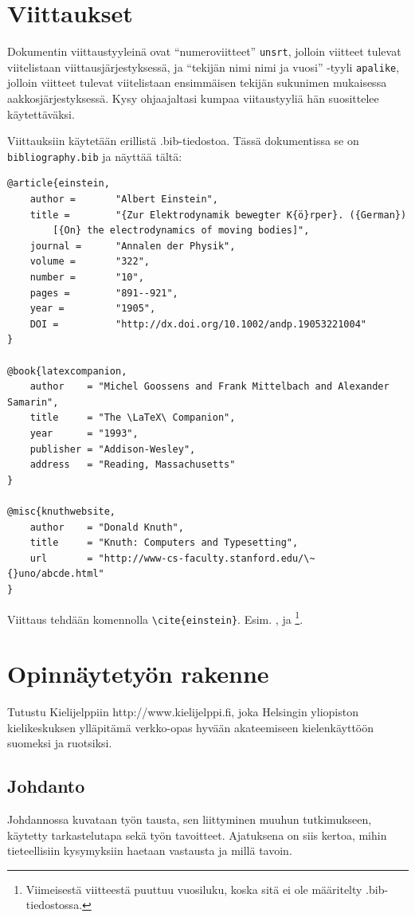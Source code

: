 \documentclass[finnish,twoside,openright,utf]{HYgradu}
\begin{document}
\chapter{Viittaukset}

Dokumentin viittaustyyleinä ovat ``numeroviitteet'' \texttt{unsrt}, jolloin viitteet tulevat viitelistaan viittausjärjestyksessä,  ja  ``tekijän nimi nimi ja vuosi'' -tyyli \texttt{apalike}, jolloin viitteet tulevat viitelistaan ensimmäisen tekijän sukunimen mukaisessa aakkosjärjestyksessä. Kysy ohjaajaltasi kumpaa viitaustyyliä hän suosittelee käytettäväksi.

Viittauksiin käytetään erillistä .bib-tiedostoa. Tässä dokumentissa se on \texttt{bibliography.bib} ja näyttää tältä:
\begin{verbatim}
@article{einstein,
    author =       "Albert Einstein",
    title =        "{Zur Elektrodynamik bewegter K{ö}rper}. ({German})
        [{On} the electrodynamics of moving bodies]",
    journal =      "Annalen der Physik",
    volume =       "322",
    number =       "10",
    pages =        "891--921",
    year =         "1905",
    DOI =          "http://dx.doi.org/10.1002/andp.19053221004"
}
 
@book{latexcompanion,
    author    = "Michel Goossens and Frank Mittelbach and Alexander Samarin",
    title     = "The \LaTeX\ Companion",
    year      = "1993",
    publisher = "Addison-Wesley",
    address   = "Reading, Massachusetts"
}
 
@misc{knuthwebsite,
    author    = "Donald Knuth",
    title     = "Knuth: Computers and Typesetting",
    url       = "http://www-cs-faculty.stanford.edu/\~{}uno/abcde.html"
}
\end{verbatim}

Viittaus tehdään komennolla \texttt{\textbackslash cite\{einstein\}}. Esim. 
\cite{einstein}, \cite{latexcompanion} ja \cite{knuthwebsite}\footnote{Viimeisestä viitteestä puuttuu vuosiluku, koska sitä ei ole määritelty .bib-tiedostossa.}.

\chapter{ Opinnäytetyön rakenne}

Tutustu Kielijelppiin http://www.kielijelppi.fi, joka Helsingin  yliopiston kielikeskuksen ylläpitämä verkko-opas hyvään akateemiseen kielenkäyttöön suomeksi ja ruotsiksi.  

\section{Johdanto}
Johdannossa kuvataan työn tausta, sen liittyminen muuhun tutkimukseen, käytetty tarkastelutapa sekä työn tavoitteet. Ajatuksena on siis kertoa, mihin tieteellisiin kysymyksiin haetaan vastausta ja millä tavoin.
\end{document}
